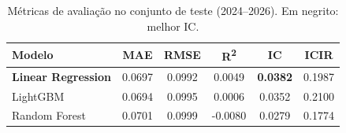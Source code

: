 \begin{table}[htbp]
\centering
\caption{Métricas de avaliação no conjunto de teste (2024--2026). Em negrito: melhor IC.}
\label{tab:metrics}
\begin{tabular}{lccccc}
\toprule
\textbf{Modelo} & \textbf{MAE} & \textbf{RMSE} & \textbf{R\textsuperscript{2}} & \textbf{IC} & \textbf{ICIR} \\
\midrule
    \textbf{Linear Regression} & 0.0697 & 0.0992 & 0.0049 & \textbf{0.0382} & 0.1987 \\
    LightGBM & 0.0694 & 0.0995 & 0.0006 & 0.0352 & 0.2100 \\
    Random Forest & 0.0701 & 0.0999 & -0.0080 & 0.0279 & 0.1774 \\
\bottomrule
\end{tabular}
\end{table}